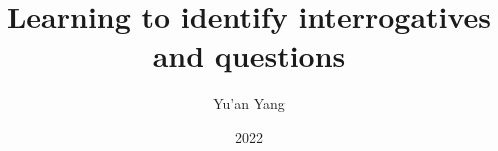 \documentclass[12pt]{umd-thesis}
\title{Learning to identify interrogatives and questions}
\author{Yu'an Yang}
\date{2022}
\begin{document}

\frontmatter

\begin{abstract}
  
\end{abstract}

\maketitlepage

\makecopyrightpage

\begin{preface}

\end{preface}

\begin{acknowledgments}
  
\end{acknowledgments}

\tableofcontents\clearpage
\listoftables\clearpage
\listoffigures\clearpage
\begin{abbreviations}
  \renewcommand{\glossarysection}[2][]{}
  \printglossary[nonumberlist]
\end{abbreviations}


\mainmatter









\begin{appendices}
  
\end{appendices}



\backmatter

\printbibliography
\end{document}
